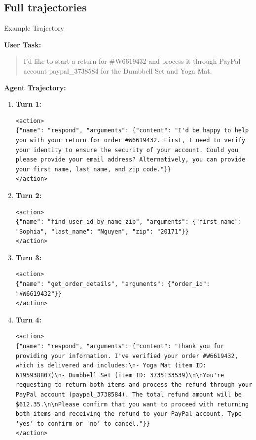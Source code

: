 \subsection{Full trajectories}
\begin{prompt}{Example Trajectory}

    \textbf{User Task:}
    \begin{quote}
    I'd like to start a return for \#W6619432 and process it through PayPal account paypal\_3738584 for the Dumbbell Set and Yoga Mat.
    \end{quote}

    \textbf{Agent Trajectory:}
    \begin{enumerate}
        \item \textbf{Turn 1:}
        \begin{lstlisting}
<action>
{"name": "respond", "arguments": {"content": "I'd be happy to help you with your return for order #W6619432. First, I need to verify your identity to ensure the security of your account. Could you please provide your email address? Alternatively, you can provide your first name, last name, and zip code."}}
</action>
        \end{lstlisting}

        \item \textbf{Turn 2:}
        \begin{lstlisting}
<action>
{"name": "find_user_id_by_name_zip", "arguments": {"first_name": "Sophia", "last_name": "Nguyen", "zip": "20171"}}
</action>
        \end{lstlisting}

        \item \textbf{Turn 3:}
        \begin{lstlisting}
<action>
{"name": "get_order_details", "arguments": {"order_id": "#W6619432"}}
</action>
        \end{lstlisting}

        \item \textbf{Turn 4:}
        \begin{lstlisting}
<action>
{"name": "respond", "arguments": {"content": "Thank you for providing your information. I've verified your order #W6619432, which is delivered and includes:\n- Yoga Mat (item ID: 6195938807)\n- Dumbbell Set (item ID: 3735133539)\n\nYou're requesting to return both items and process the refund through your PayPal account (paypal_3738584). The total refund amount will be $612.35.\n\nPlease confirm that you want to proceed with returning both items and receiving the refund to your PayPal account. Type 'yes' to confirm or 'no' to cancel."}}
</action>
        \end{lstlisting}


\end{enumerate}
\end{prompt}
